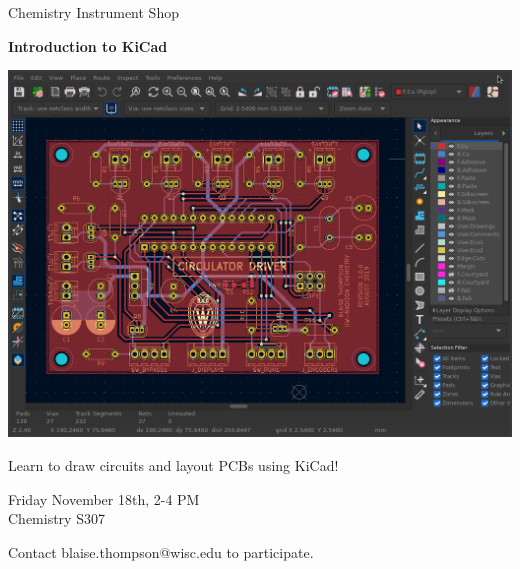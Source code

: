 \documentclass{article}
\begin{document}
\center

\Huge

Chemistry Instrument Shop

\textbf{
Introduction to KiCad
}

\includegraphics[width=\linewidth]{coverart.png}

{
\huge
Learn to draw circuits and layout PCBs using KiCad!
}

\vfill

{
\huge
Friday November 18th, 2-4 PM \\
Chemistry S307
}

\vfill

{
\huge
Contact blaise.thompson@wisc.edu to participate.
}
\end{document}
